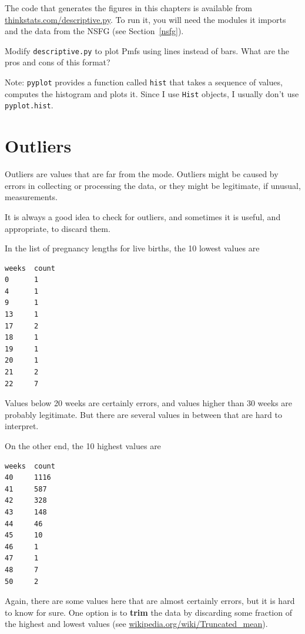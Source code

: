 \documentclass[12pt]{book}
\begin{document}
\begin{ex}

The code that generates the figures in this chapters is available from
\url{thinkstats.com/descriptive.py}.  To run it, you will need the
modules it imports and the data from the NSFG (see
Section~\ref{nsfg}).

Modify {\tt descriptive.py} to plot Pmfs using lines instead of
bars.  What are the pros and cons of this format?

Note: {\tt pyplot} provides a function called {\tt hist} that
takes a sequence of values, computes the histogram and plots it.
Since I use {\tt Hist} objects, I usually don't use {\tt pyplot.hist}.

\end{ex}


\section{Outliers}

Outliers are values that are far from the mode.  Outliers might
be caused by errors in collecting or processing the data, or
they might be legitimate, if unusual, measurements.

It is always a good idea to check for outliers, and sometimes
it is useful, and appropriate, to discard them.

In the list of pregnancy lengths for live births, the 10 lowest values are

\begin{verbatim}
weeks  count
0      1
4      1
9      1
13     1
17     2
18     1
19     1
20     1
21     2
22     7
\end{verbatim}

Values below 20 weeks are certainly errors, and values higher than 30
weeks are probably legitimate.  But there are several values in
between that are hard to interpret.

On the other end, the 10 highest values are

\begin{verbatim}
weeks  count
40     1116
41     587
42     328
43     148
44     46
45     10
46     1
47     1
48     7
50     2
\end{verbatim}

Again, there are some values here that are almost certainly errors,
but it is hard to know for sure.  One option is to {\bf trim} the data
by discarding some fraction of the highest and lowest values (see
\url{wikipedia.org/wiki/Truncated_mean}).
\end{document}
